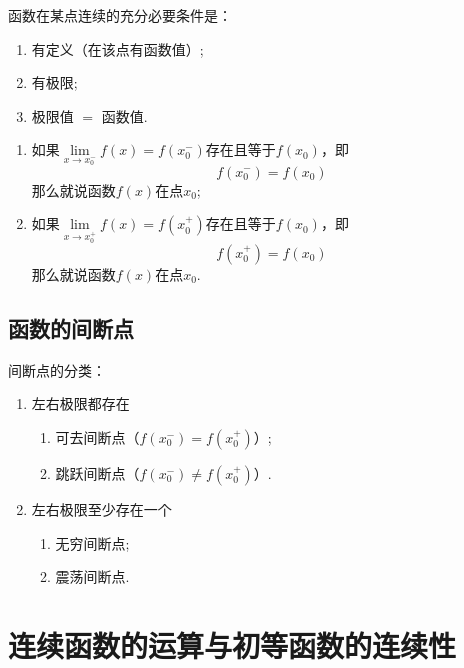 \documentclass[lang=cn,10pt]{elegantbook}
\begin{document}
\begin{note}
	\label{not:tiaojian}
	函数在某点连续的{\heiti 充分必要条件}是：
	\begin{enumerate}[label=\( \Circled{\arabic*} \)]
		\item 有定义（在该点有函数值）;
		\item 有极限;
		\item 极限值 \( = \) 函数值.
	\end{enumerate}
\end{note}

\begin{definition}[左右连续]
	\begin{enumerate}
		\item 如果\( \lim\limits_{x \to x_{0}^{-}}f(x) = f(x_{0}^{-}) \)存在且等于\( f(x_{0}) \)，即
		\[ f(x_{0}^{-}) = f(x_{0}) \]
		那么就说函数\( f(x) \)在点\( x_{0} \);
		\item 如果\( \lim\limits_{x \to x_{0}^{+}}f(x) = f(x_{0}^{+}) \)存在且等于\( f(x_{0}) \)，即
		\[ f(x_{0}^{+}) = f(x_{0}) \]
		那么就说函数\( f(x) \)在点\( x_{0} \).
	\end{enumerate}
\end{definition}

\subsection{函数的间断点}
\begin{note}
	间断点的分类：
	\begin{enumerate}[label=\Roman*类：]
		\item 左右极限都存在
		\begin{enumerate}
			\item 可去间断点（\( f(x_{0}^{-}) = f(x_{0}^{+}) \)）;
			\item 跳跃间断点（\( f(x_{0}^{-}) \neq f(x_{0}^{+}) \)）.
		\end{enumerate}
		\item 左右极限至少存在一个
		\begin{enumerate}
			\item 无穷间断点;
			\item 震荡间断点.
		\end{enumerate}
	\end{enumerate}
\end{note}

\section{连续函数的运算与初等函数的连续性}
\end{document}

